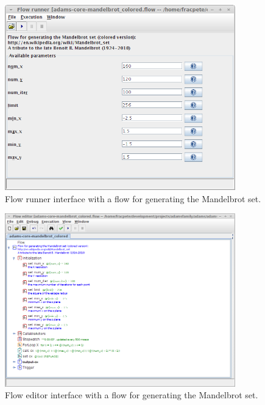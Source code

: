 \begin{figure}[htb]
  \centering
  \includegraphics[width=10.0cm]{images/flowrunner-mandelbrot.png}
  \caption{Flow runner interface with a flow for generating the Mandelbrot set.}
  \label{flowrunner-mandelbrot}
\end{figure}

\begin{figure}[htb]
  \centering
  \includegraphics[width=10.0cm]{images/floweditor-mandelbrot.png}
  \caption{Flow editor interface with a flow for generating the Mandelbrot set.}
  \label{floweditor-mandelbrot}
\end{figure}

